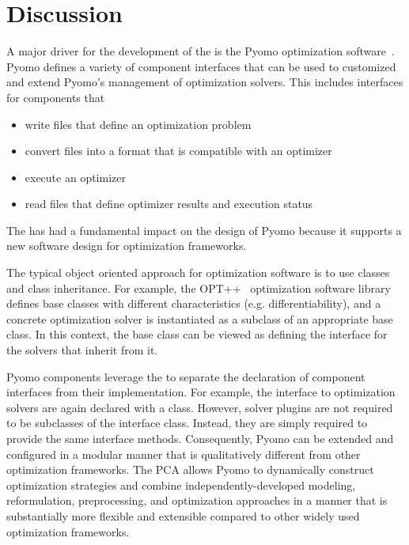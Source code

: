
\section{Discussion}

\label{chap:disc}

A major driver for the development of the \pcasp is the Pyomo optimization software~\cite{Pyomo}. 
Pyomo defines a variety of component interfaces that can be used to
customized and extend Pyomo's management of optimization solvers.  This includes interfaces for components that 
\begin{itemize}
\item write files that define an optimization problem
\item convert files into a format that is compatible with an optimizer
\item execute an optimizer
\item read files that define optimizer results and execution status
\end{itemize}
The \pcasp has had a fundamental impact on the design of Pyomo because it
supports a new software design for optimization frameworks.

The typical object oriented approach for optimization software is
to use classes and class inheritance.  For example, the OPT++~\cite{Mez94}
optimization software library defines base classes with different
characteristics (e.g. differentiability), and a concrete optimization
solver is instantiated as a subclass of an appropriate base class.  In this
context, the base class can be viewed as defining the interface for the 
solvers that inherit from it.

Pyomo components leverage the \pcasp to separate the declaration
of component interfaces from their implementation.  For example,
the interface to optimization solvers are again declared with a class.
However, solver plugins are not required to be subclasses of the interface
class.  Instead, they are simply required to provide the same interface
methods.  Consequently, Pyomo can be extended and configured in a modular
manner that is qualitatively different from other optimization frameworks.
The PCA allows Pyomo to dynamically construct optimization strategies and
combine independently-developed modeling, reformulation, preprocessing,
and optimization approaches in a manner that is substantially more
flexible and extensible compared to other widely used optimization
frameworks.

